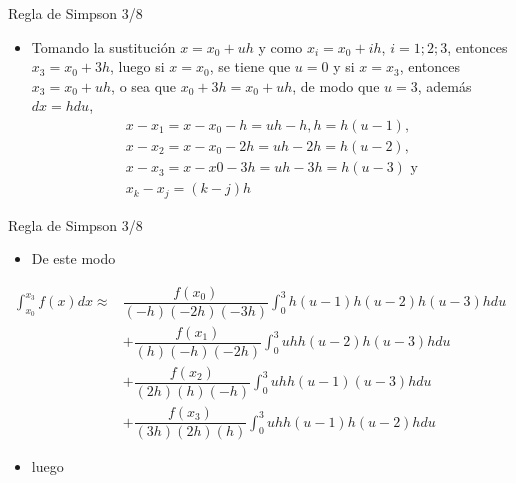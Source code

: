 \documentclass[12pt]{beamer}
\begin{document}
\begin{frame}{Regla de Simpson 3/8}
  \begin{itemize}
    \item Tomando la sustituci\'on $x = x_0 + uh$ y como $x_i = x_0 + ih$, $i = 1; 2; 3$,
    entonces $x_3 = x_0 + 3h$, luego si $x = x_0$, se tiene que $u = 0$ y si $x = x_3$,
    entonces $x_3 = x_0 + uh$, o sea que $x_0 + 3h = x_0 + uh$, de modo que $u = 3$,
    adem\'as $dx = hdu$,
    $$
    \begin{array}{l}
    x - x_1 = x-x_0-h = uh - h, h = h(u-1),\\
    x - x_2 = x-x_0-2h = uh-2h = h(u-2),\\
    x-x_3 = x-x0-3h = uh-3h = h(u-3) \text{ y} \\ 
    x_k - x_j = (k - j)h
    \end{array}
    $$    
  \end{itemize}
\end{frame}
\begin{frame}{Regla de Simpson 3/8}
  \begin{itemize}
    \item De este modo
  \end{itemize}{
    \footnotesize{
    \begin{align*}
        \int_{x_0}^{x_3}f(x)dx \approx & \dfrac{f(x_0)}{(-h)(-2h)(-3h)}\int_{0}^{3}h(u-1)h(u-2)h(u-3)hdu \\
        & + \dfrac{f(x_1)}{(h)(-h)(-2h)}\int_{0}^{3}uhh(u-2)h(u-3)hdu\\
        & + \dfrac{f(x_2)}{(2h)(h)(-h)}\int_{0}^{3}uhh(u-1)(u-3)hdu \\
        & + \dfrac{f(x_3)}{(3h)(2h)(h)}\int_{0}^{3}uhh(u-1)h(u-2)hdu
    \end{align*}}}
    \begin{itemize}
      \item<2-> luego
    \end{itemize}
\end{frame}
\end{document}
